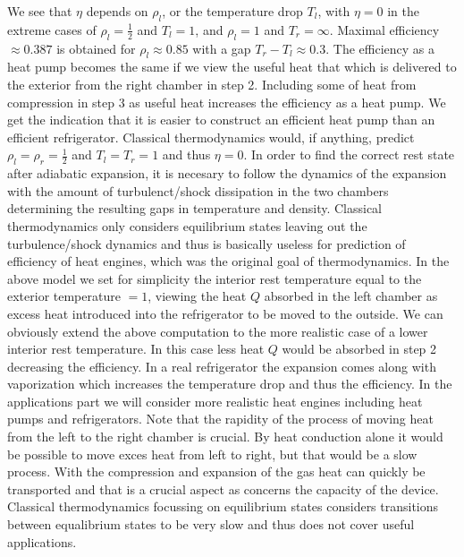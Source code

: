 We see that $\eta$ depends on $\rho_l$, or the temperature drop $T_l$,  with $\eta = 0$ in the extreme cases of 
$\rho_l =\frac{1}{2}$ and $T_l = 1$, and $\rho_l =1$ and $T_r = \infty$. Maximal efficiency $\approx 0.387$ is obtained for $\rho_l\approx 0.85$ with a gap $T_r-T_l\approx 0.3$.
\newline
\indent
The efficiency as a heat pump becomes the same if we view the useful heat that which is delivered to the exterior from the right chamber in step 2. Including some of heat from compression in step 3 as useful heat increases the 
efficiency as a heat pump. We get the indication that it is easier to construct an efficient heat pump 
than an efficient refrigerator. 
\newline
\indent
Classical thermodynamics would, if anything, predict $\rho_l=\rho_r=\frac{1}{2}$ 
and $T_l=T_r=1$ and thus $\eta =0$.
In order to find the correct rest state after adiabatic expansion, it is necesary to follow the dynamics
of the expansion with the amount of turbulenct/shock dissipation in the two chambers determining the resulting
gaps in temperature and density. Classical thermodynamics only considers equilibrium states leaving out the
turbulence/shock dynamics and thus is basically useless for prediction of efficiency of heat engines, which was the original goal of thermodynamics. 
\newline
\indent 
In the above model we set for simplicity the interior rest temperature equal to the exterior temperature $=1$, 
viewing the heat $Q$ absorbed in the left chamber as excess heat introduced into the refrigerator to be 
moved to the outside. We can obviously extend the above computation to the more realistic case of 
a lower interior rest temperature. In this case less heat $Q$ would be absorbed in step 2 decreasing the 
efficiency. 
\newline
\indent
In a real refrigerator the expansion comes along with vaporization which increases the temperature drop
and thus the efficiency. In the applications part we will consider more realistic heat engines including
heat pumps and refrigerators. 
\newline
\indent
Note that the rapidity of the process of moving heat from the left to the right chamber is crucial.
By heat conduction alone it would be possible to move exces heat from left to right, but that would be a slow
process. With the compression and expansion of the gas heat can quickly be transported and that is a
crucial aspect as concerns the capacity of the device.
\newline
\indent
Classical thermodynamics focussing on equilibrium states considers transitions between equalibrium states 
to be very slow and thus does not cover useful applications.
 
